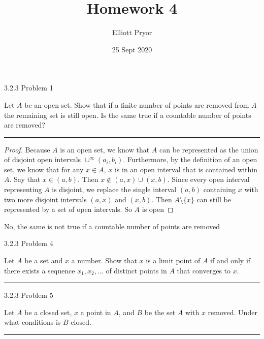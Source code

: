 \documentclass[11pt]{article}
\title{Homework 4}
\author{Elliott Pryor}
\date{25 Sept 2020}
\begin{document}
\maketitle



 3.2.3 Problem 1

Let $A$ be an open set. Show that if a finite number of points are removed from $A$ the remaining set is still open. Is the same true if a countable number of points are removed?
\hrule

\begin{proof}

Because $A$ is an open set, we know that $A$ can be represented as the union of disjoint open intervals $\cup^\infty (a_i, b_i)$. 
Furthermore, by the definition of an open set, we know that for any $x \in A$, $x$ is in an open interval that is contained within $A$.
Say that $x \in (a, b)$. Then $x \notin (a, x)\cup(x,b)$. Since every open interval representing $A$ is disjoint, we replace the single interval $(a,b)$ containing $x$ with two more disjoint intervals $(a, x)$ and $(x, b)$. Then $A \setminus \{x\}$ can still be represented by a set of open intervals. So $A$ is open
\end{proof}

No, the same is not true if a countable number of points are removed




\newpage
{} 3.2.3 Problem 4

Let $A$ be a set and $x$ a number. Show that $x$ is a limit point of $A$ if and only if there exists a sequence $x_1, x_2, ...$ of distinct points in $A$ that converges to $x$.

\hrule

\newpage
{} 3.2.3 Problem 5

Let $A$ be a closed set, $x$ a point in $A$, and $B$ be the set $A$ with $x$ removed. Under what conditions is $B$ closed. 

\hrule
\end{document}
